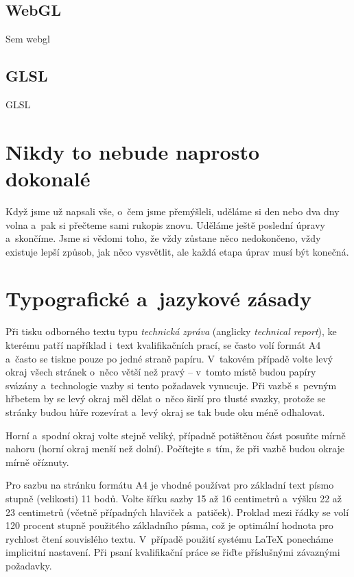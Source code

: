 \newpage

\section{WebGL}
Sem webgl

\newpage

\section{GLSL}
GLSL


\chapter{Nikdy to nebude naprosto dokonalé}
Když jsme už napsali vše, o~čem jsme přemýšleli, uděláme si den nebo dva dny volna a~pak si přečteme sami rukopis znovu. Uděláme ještě poslední úpravy a~skončíme. Jsme si vědomi toho, že vždy zůstane něco nedokončeno, vždy existuje lepší způsob, jak něco vysvětlit, ale každá etapa úprav musí být konečná.


\chapter{Typografické a~jazykové zásady}
Při tisku odborného textu typu {\it technická zpráva} (anglicky {\it technical report}), ke kterému patří například i~text kvalifikačních prací, se často volí formát A4 a~často se tiskne pouze po jedné straně papíru. V~takovém případě volte levý okraj všech stránek o~něco větší než pravý -- v~tomto místě budou papíry svázány a~technologie vazby si tento požadavek vynucuje. Při vazbě s~pevným hřbetem by se levý okraj měl dělat o~něco širší pro tlusté svazky, protože se stránky budou hůře rozevírat a~levý okraj se tak bude oku méně odhalovat.

Horní a~spodní okraj volte stejně veliký, případně potištěnou část posuňte mírně nahoru (horní okraj menší než dolní). Počítejte s~tím, že při vazbě budou okraje mírně oříznuty.

Pro sazbu na stránku formátu A4 je vhodné používat pro základní text písmo stupně (velikosti) 11 bodů. Volte šířku sazby 15 až 16 centimetrů a~výšku 22 až 23 centimetrů (včetně případných hlaviček a~patiček). Proklad mezi řádky se volí 120 procent stupně použitého základního písma, což je optimální hodnota pro rychlost čtení souvislého textu. V~případě použití systému LaTeX ponecháme implicitní nastavení. Při psaní kvalifikační práce se řiďte příslušnými závaznými požadavky.

